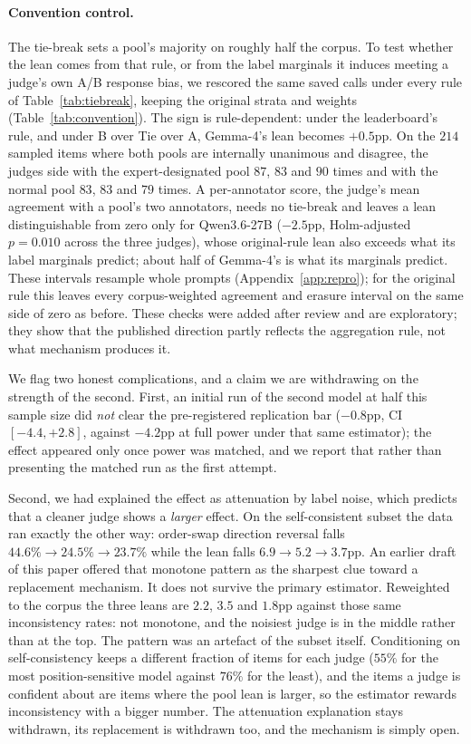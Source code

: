 \documentclass{article}
\begin{document}
\paragraph{Convention control.} The tie-break sets a pool's majority on roughly half the
corpus. To test whether the lean comes from that rule, or from the label marginals it
induces meeting a judge's own A/B response bias, we rescored the same saved calls under
every rule of Table~\ref{tab:tiebreak}, keeping the original strata and weights
(Table~\ref{tab:convention}). The sign is rule-dependent: under the leaderboard's rule, and
under B over Tie over A, Gemma-4's lean becomes $+0.5$pp. On the $214$ sampled items where
both pools are internally unanimous and disagree, the judges side with the
expert-designated pool $87$, $83$ and $90$ times and with the normal pool $83$, $83$ and
$79$ times. A per-annotator score, the judge's mean agreement with a pool's two annotators,
needs no tie-break and leaves a lean distinguishable from zero only for Qwen3.6-27B
($-2.5$pp, Holm-adjusted $p = 0.010$ across the three judges), whose original-rule lean
also exceeds what its label marginals predict; about half of Gemma-4's is what its
marginals predict.
These intervals resample whole prompts (Appendix~\ref{app:repro}); for the original rule
this leaves every corpus-weighted agreement and erasure interval on the same side of zero
as before. These checks
were added after review and are exploratory; they show that the published direction partly
reflects the aggregation rule, not what mechanism produces it.


We flag two honest complications, and a claim we are withdrawing on the strength of the
second. First, an initial run of the second model at half this sample size did \emph{not}
clear the pre-registered replication bar ($-0.8$pp, CI $[-4.4, +2.8]$, against $-4.2$pp at
full power under that same estimator); the effect appeared only once power was matched, and
we report that rather than presenting the matched run as the first attempt.

Second, we had explained the effect as attenuation by label noise, which predicts that a
cleaner judge shows a \emph{larger} effect. On the self-consistent subset the data ran
exactly the other way: order-swap direction reversal falls $44.6\% \to 24.5\% \to
23.7\%$ while the lean falls $6.9 \to 5.2 \to 3.7$pp. An earlier draft of this paper
offered that monotone pattern as the sharpest clue toward a replacement mechanism. It does
not survive the primary estimator. Reweighted to the corpus the three leans are $2.2$,
$3.5$ and $1.8$pp against those same inconsistency rates: not monotone, and the noisiest
judge is in the middle rather than at the top. The pattern was an artefact of the subset
itself. Conditioning on self-consistency keeps a different fraction of items for each
judge ($55\%$ for the most position-sensitive model against $76\%$ for the least), and
the items a judge is confident about are items where the pool lean is larger, so the
estimator rewards inconsistency with a bigger number. The attenuation explanation stays
withdrawn, its replacement is withdrawn too, and the mechanism is simply open.
\end{document}
